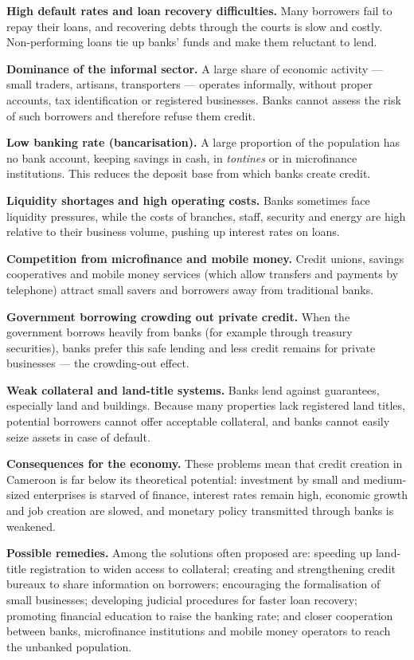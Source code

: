 \documentclass[11pt]{article}
\newcommand{\cle}[1]{{\popxbold\color{popdark}#1}}
\begin{document}
\textbf{High default rates and loan recovery difficulties.} Many borrowers fail to repay their loans, and recovering debts through the courts is slow and costly. Non-performing loans tie up banks' funds and make them reluctant to lend.

\textbf{Dominance of the informal sector.} A large share of economic activity — small traders, artisans, transporters — operates informally, without proper accounts, tax identification or registered businesses. Banks cannot assess the risk of such borrowers and therefore refuse them credit.

\textbf{Low banking rate (bancarisation).} A large proportion of the population has no bank account, keeping savings in cash, in \emph{tontines} or in microfinance institutions. This reduces the deposit base from which banks create credit.

\textbf{Liquidity shortages and high operating costs.} Banks sometimes face liquidity pressures, while the costs of branches, staff, security and energy are high relative to their business volume, pushing up interest rates on loans.

\textbf{Competition from microfinance and mobile money.} Credit unions, savings cooperatives and mobile money services (which allow transfers and payments by telephone) attract small savers and borrowers away from traditional banks.

\textbf{Government borrowing crowding out private credit.} When the government borrows heavily from banks (for example through treasury securities), banks prefer this safe lending and less credit remains for private businesses — the \cle{crowding-out} effect.

\textbf{Weak collateral and land-title systems.} Banks lend against guarantees, especially land and buildings. Because many properties lack registered land titles, potential borrowers cannot offer acceptable collateral, and banks cannot easily seize assets in case of default.

\textbf{Consequences for the economy.} These problems mean that credit creation in Cameroon is far below its theoretical potential: investment by small and medium-sized enterprises is starved of finance, interest rates remain high, economic growth and job creation are slowed, and monetary policy transmitted through banks is weakened.

\textbf{Possible remedies.} Among the solutions often proposed are: speeding up land-title registration to widen access to collateral; creating and strengthening credit bureaux to share information on borrowers; encouraging the formalisation of small businesses; developing judicial procedures for faster loan recovery; promoting financial education to raise the banking rate; and closer cooperation between banks, microfinance institutions and mobile money operators to reach the unbanked population.
\end{document}
